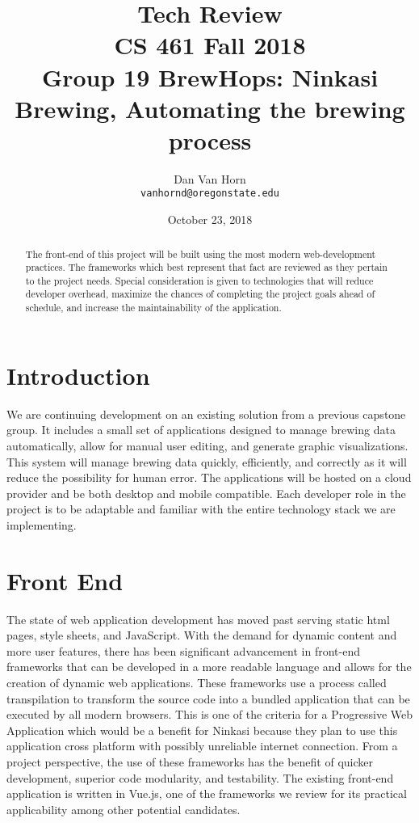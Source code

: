 \documentclass[draftclsnofoot,onecolumn,journal,letterpaper,compsoc,10pt]{IEEEtran}
\date{October 23, 2018}
\begin{document}
\begin{titlingpage}
    \title{Tech Review\\\large CS 461 Fall 2018\\Group 19 BrewHops: Ninkasi Brewing, Automating the brewing process}
    \author{
        Dan Van Horn \\
        \texttt{vanhornd@oregonstate.edu} \\
    }
    \maketitle
    \begin{abstract}
    The front-end of this project will be built using the most modern web-development practices. The frameworks which best represent that fact are reviewed as they pertain to the project needs. Special consideration is given to technologies that will reduce developer overhead, maximize the chances of completing the project goals ahead of schedule, and increase the maintainability of the application.
    \end{abstract}
    \pagebreak
    \tableofcontents
\end{titlingpage}
    \section{Introduction}
    We are continuing development on an existing solution from a previous capstone group. It includes a small set of applications designed to manage brewing data automatically, allow for manual user editing, and generate graphic visualizations. This system will manage brewing data quickly, efficiently, and correctly as it will reduce the possibility for human error. The applications will be hosted on a cloud provider and be both desktop and mobile compatible. Each developer role in the project is to be adaptable and familiar with the entire technology stack we are implementing.
    \section{Front End}
    The state of web application development has moved past serving static html pages, style sheets, and JavaScript. With the demand for dynamic content and more user features, there has been significant advancement in front-end frameworks that can be developed in a more readable language and allows for the creation of dynamic web applications. These frameworks use a process called transpilation to transform the source code into a bundled application that can be executed by all modern browsers. This is one of the criteria for a Progressive Web Application which would be a benefit for Ninkasi because they plan to use this application cross platform with possibly unreliable internet connection. From a project perspective, the use of these frameworks has the benefit of quicker development, superior code modularity, and testability. The existing front-end application is written in Vue.js, one of the frameworks we review for its practical applicability among other potential candidates.
\end{document}
